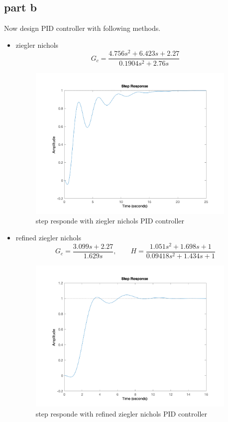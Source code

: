 \subsection{part b}
Now design PID controller with following methods.
\newpage
\begin{itemize}
    \item ziegler nichols
    $$
    G_c =   \dfrac{4.756 s^2 + 6.423 s + 2.27}{0.1904 s^2 + 2.76 s}
    $$
    \begin{figure}[H]
        \caption{step responde with ziegler nichols PID controller}
        \centering
        \includegraphics[width=10cm]{../Figure/Q1/b/zn.png}
    \end{figure}
    \item refined ziegler nichols
    $$
    G_c =     \dfrac{3.099 s + 2.27}{1.629 s}, \qquad H =    
    \dfrac{1.051 s^2 + 1.698 s + 1}{0.09418 s^2 + 1.434 s + 1}
    $$
    \begin{figure}[H]
        \caption{step responde with refined ziegler nichols PID controller}
        \centering
        \includegraphics[width=10cm]{../Figure/Q1/b/rzn.png}
    \end{figure}

\end{itemize}
